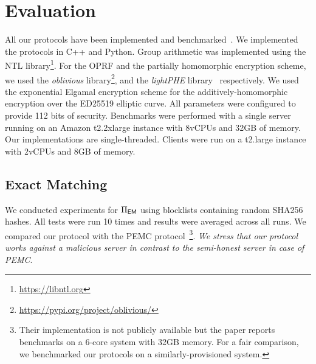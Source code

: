 \section{Evaluation}






All our protocols have been implemented and benchmarked~\cite{code}. 
We implemented the protocols in C++ and Python. Group arithmetic was implemented using the NTL library\footnote{\url{https://libntl.org}}.  For the OPRF and the partially homomorphic encryption scheme, we used the \emph{oblivious} library\footnote{\url{https://pypi.org/project/oblivious/}}, and the \emph{lightPHE} library~\cite{serengil2024lightphe} respectively. We used the exponential Elgamal encryption scheme for the additively-homomorphic encryption over the ED25519 elliptic curve. All parameters were configured to provide 112 bits of security. 
Benchmarks were performed with a single server running on an Amazon t2.2xlarge instance with 8vCPUs and 32GB of memory. Our implementations are single-threaded. Clients were run on a t2.large instance with 2vCPUs and 8GB of memory. 	






\subsection{Exact Matching}
%
We conducted experiments for $\Pi_{\mathsf{EM}}$ using blocklists containing random SHA256 hashes. All tests were run 10 times and results were averaged across all runs. We compared our protocol with the PEMC protocol~\cite{kulshrestha2021identifying}\footnote{Their implementation is not publicly available but the paper reports benchmarks on a 6-core system with 32GB memory. For a fair comparison, we benchmarked our protocols on a similarly-provisioned system.}. \emph{We stress that our protocol works against a malicious server in contrast to the semi-honest server in case of PEMC}. 

